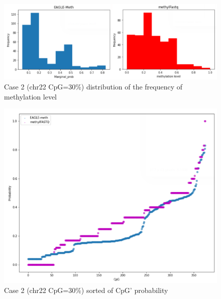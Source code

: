 \documentclass{PHlab-thesis}
\begin{document}
\begin{figure}[h!]
  \centering
  \includegraphics[scale=0.8]{figures/CHR22_30.PNG}
  \caption{Case 2 (chr22 CpG=30\%) distribution of the frequency of methylation level}
  \label{fig:case_2_1} 
\end{figure}
\begin{figure}[h!]
  \centering
  \includegraphics[scale=0.8]{figures/CHR22_30_2.PNG}
  \caption{Case 2 (chr22 CpG=30\%) sorted of CpG' probability}
  \label{fig:case_2_2} 
\end{figure}
\end{document}
